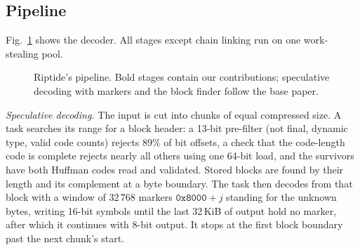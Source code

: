 \documentclass[conference]{IEEEtran}
\begin{document}
\subsection{Pipeline}

Fig.~\ref{fig:pipeline} shows the decoder. All stages except chain linking run on
one work-stealing pool.

\begin{figure}[t]
\centering
{}
\caption{Riptide's pipeline. Bold stages contain our contributions; speculative
decoding with markers and the block finder follow the base paper.}
\label{fig:pipeline}
\end{figure}

\emph{Speculative decoding.} The input is cut into chunks of equal compressed size.
A task searches its range for a block header: a 13-bit pre-filter (not final,
dynamic type, valid code counts) rejects 89\% of bit offsets, a check that the
code-length code is complete rejects nearly all others using one 64-bit load, and
the survivors have both Huffman codes read and validated. Stored blocks are found by
their length and its complement at a byte boundary. The task then decodes from that
block with a window of 32\,768 markers $\mathtt{0x8000}+j$ standing for the unknown
bytes, writing 16-bit symbols until the last 32\,KiB of output hold no marker, after
which it continues with 8-bit output. It stops at the first block boundary past the
next chunk's start.
\end{document}
